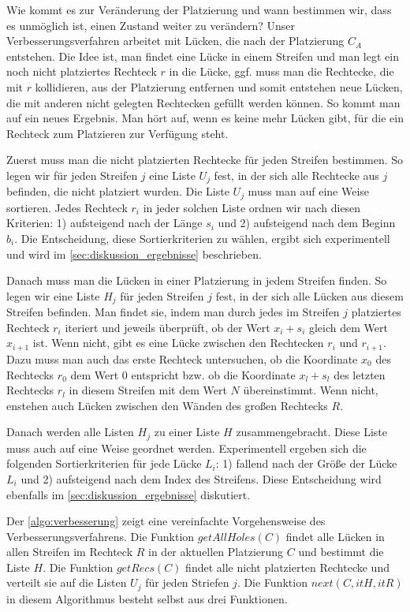 Wie kommt es zur Veränderung der Platzierung und wann bestimmen wir,
dass es unmöglich ist, einen Zustand weiter zu verändern?
Unser Verbesserungsverfahren arbeitet mit Lücken, die 
nach der Platzierung $C_A$ entstehen.
Die Idee ist, man findet eine Lücke in einem Streifen 
und man legt ein noch nicht platziertes Rechteck $r$ in die Lücke,
ggf. muss man die Rechtecke,
die mit $r$ kollidieren, aus der Platzierung entfernen
und somit entstehen neue Lücken,
die mit anderen nicht gelegten Rechtecken gefüllt werden können.
So kommt man auf ein neues Ergebnis.
Man hört auf, wenn es keine mehr Lücken gibt, für die ein Rechteck zum Platzieren zur Verfügung steht.


Zuerst muss man die nicht platzierten Rechtecke für jeden Streifen bestimmen. 
So legen wir für jeden Streifen $j$ eine Liste $U_j$ fest, in der sich alle 
Rechtecke aus $j$ befinden, die nicht platziert wurden.
Die Liste $U_j$ muss man auf eine Weise sortieren.
Jedes Rechteck $r_i$ in jeder solchen Liste ordnen wir nach diesen Kriterien:
1) aufsteigend nach der Länge $s_i$ und 2) aufsteigend nach dem Beginn $b_i$.
Die Entscheidung, diese Sortierkriterien zu wählen, ergibt sich experimentell 
und wird im \cref{sec:diskussion_ergebnisse} beschrieben.


Danach muss man die Lücken in einer Platzierung in jedem Streifen finden.
So legen wir eine Liste $H_j$ für jeden Streifen $j$ fest, in der sich alle
Lücken aus diesem Streifen befinden. Man findet sie, indem
man durch jedes im Streifen $j$ platziertes Rechteck $r_i$ iteriert und jeweils überprüft,
ob der Wert $x_i + s_i$ gleich dem Wert $x_{i+1}$ ist. Wenn nicht, gibt es eine Lücke
zwischen den Rechtecken $r_i$ und $r_{i+1}$.
Dazu muss man auch das erste Rechteck untersuchen, ob die Koordinate $x_0$ des Rechtecks $r_0$
dem Wert 0 entspricht bzw. ob die Koordinate $x_l + s_l$ des letzten Rechtecks $r_l$ in diesem Streifen
mit dem Wert $N$ übereinstimmt.
Wenn nicht, enstehen auch Lücken zwischen den Wänden des großen Rechtecks $R$.  

Danach werden alle Listen $H_j$ zu einer Liste $H$ zusammengebracht.
Diese Liste muss auch auf eine Weise geordnet werden. 
Experimentell ergeben sich die folgenden Sortierkriterien für jede Lücke $L_i$: 
1) fallend nach der Größe der Lücke $L_i$ und 2) aufsteigend nach dem
Index des Streifens. Diese Entscheidung wird ebenfalls im \cref{sec:diskussion_ergebnisse}
diskutiert.



Der \cref{algo:verbesserung} zeigt eine vereinfachte Vorgehensweise des Verbesserungsverfahrens.
Die Funktion $getAllHoles(C)$ findet alle Lücken in allen Streifen im Rechteck $R$ in der
aktuellen Platzierung $C$ und bestimmt die Liste $H$.
Die Funktion $getRecs(C)$ findet alle nicht platzierten Rechtecke und verteilt sie auf
die Listen $U_j$ für jeden Striefen $j$.
Die Funktion $next(C, itH, itR)$ in diesem Algorithmus besteht selbst aus drei Funktionen.

